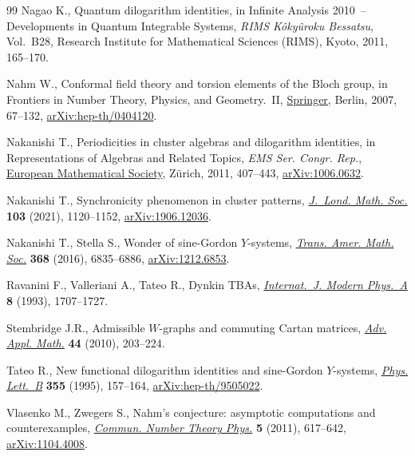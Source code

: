 \documentclass[pdftex]{sigma}
\numberwithin{equation}{section}
\theoremstyle{definition}
\begin{document}
\begin{thebibliography}{99}
Nagao K., Quantum dilogarithm identities, in Infinite {A}nalysis 2010~--
 {D}evelopments in {Q}uantum {I}ntegrable {S}ystems, \textit{RIMS K\^oky\^uroku
 Bessatsu}, Vol.~B28, Research Institute for Mathematical Sciences (RIMS), Kyoto,
 2011, 165--170.

Nahm W., Conformal field theory and torsion elements of the {B}loch group, in
 Frontiers in {N}umber {T}heory, {P}hysics, and {G}eometry.~{II},
 \href{https://doi.org/10.1007/978-3-540-30308-4_2}{Springer}, Berlin, 2007,
 67--132, \href{http://arxiv.org/abs/hep-th/0404120}{arXiv:hep-th/0404120}.

Nakanishi T., Periodicities in cluster algebras and dilogarithm identities, in
 Representations of {A}lgebras and {R}elated {T}opics, \textit{EMS Ser. Congr. Rep.},
 \href{https://doi.org/10.4171/101-1/9}{European Mathematical Society},
 Z\"urich, 2011, 407--443,
 \href{http://arxiv.org/abs/1006.0632}{arXiv:1006.0632}.

Nakanishi T., Synchronicity phenomenon in cluster patterns,
 \href{https://doi.org/10.1112/jlms.12402}{\textit{J.~Lond. Math. Soc.}}
 \textbf{103} (2021), 1120--1152,
 \href{http://arxiv.org/abs/1906.12036}{arXiv:1906.12036}.

Nakanishi T., Stella S., Wonder of sine-{G}ordon {$Y$}-systems,
 \href{https://doi.org/10.1090/tran/6505}{\textit{Trans. Amer. Math. Soc.}}
 \textbf{368} (2016), 6835--6886,
 \href{http://arxiv.org/abs/1212.6853}{arXiv:1212.6853}.

Ravanini F., Valleriani A., Tateo R., Dynkin {TBA}s,
 \href{https://doi.org/10.1142/S0217751X93000709}{\textit{Internat.~J. Modern
 Phys.~A}} \textbf{8} (1993), 1707--1727.

Stembridge J.R., Admissible {$W$}-graphs and commuting {C}artan matrices,
 \href{https://doi.org/10.1016/j.aam.2009.08.001}{\textit{Adv. Appl. Math.}}
 \textbf{44} (2010), 203--224.

Tateo R., New functional dilogarithm identities and sine-{G}ordon
 {$Y$}-systems,
 \href{https://doi.org/10.1016/0370-2693(95)00751-6}{\textit{Phys. Lett.~B}}
 \textbf{355} (1995), 157--164,
 \href{http://arxiv.org/abs/hep-th/9505022}{arXiv:hep-th/9505022}.

Vlasenko M., Zwegers S., Nahm's conjecture: asymptotic computations and
 counterexamples,
 \href{https://doi.org/10.4310/CNTP.2011.v5.n3.a2}{\textit{Commun. Number
 Theory Phys.}} \textbf{5} (2011), 617--642,
 \href{http://arxiv.org/abs/1104.4008}{arXiv:1104.4008}.


\end{thebibliography}
\end{document}
